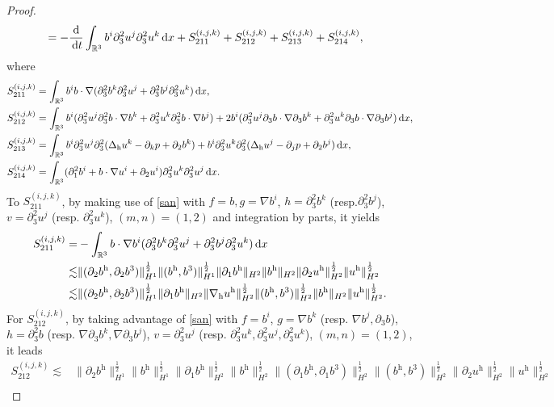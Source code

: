 \documentclass[11pt]{amsart}
\theoremstyle{definition}
\newcommand{\R}{\mathbb{R}}
\newcommand{\h}{\mathrm{h}}
\newcommand{\dx}{\,{\rm d}x}
\newcommand{\dt}{\,{\rm d}t}
\newcommand{\nablah}{\nabla_{\mathrm{h}}}
\numberwithin{equation}{section}
\begin{document}
\begin{proof}
\begin{align}
		& =-\frac{\mathrm{d}}{\dt}\int_{\R^3}b^i\partial_3^2u^j\partial_3^2u^k\dx+S^{(i,j,k)}_{211}+S^{(i,j,k)}_{212}+S^{(i,j,k)}_{213}+S^{(i,j,k)}_{214},
	\end{align}
	where
	\begin{align*}
		S^{(i,j,k)}_{211}&=\int_{\R^3} b^ib\cdot\nabla (\partial_3^2b^k\partial_3^2u^j+\partial_3^2b^j\partial_3^2u^k)\dx,\\
		S^{(i,j,k)}_{212}&=\int_{\R^3}b^i(\partial_3^2u^j\partial_3^2b\cdot\nabla b^k+\partial_3^2u^k\partial_3^2b\cdot\nabla b^j)+2b^i(\partial_3^2u^j\partial_3b\cdot\nabla \partial_3b^k+\partial_3^2u^k\partial_3b\cdot\nabla \partial_3b^j)\dx,\\
		S^{(i,j,k)}_{213}&=\int_{\R^3}b^i\partial_3^2u^j\partial_3^2(\Delta_\h u^k-\partial_kp+\partial_2b^k)+b^i\partial_3^2u^k\partial_3^2(\Delta_\h u^j-\partial_jp+\partial_2b^j)\dx,\\
		S^{(i,j,k)}_{214}&=\int_{\R^3}(\partial_1^2b^i+b\cdot\nabla u^i+\partial_2u^i)\partial_3^2u^k\partial_3^2u^j\dx.
	\end{align*}
	To $S^{(i,j,k)}_{211}$, by making use of \eqref{san} with $f=b,g=\nabla b^i$, $h=\partial_3^2b^k$ (resp.$\partial_3^2b^j$), $v=\partial_3^2u^j$ (resp. $\partial_3^2u^k$), $(m,n)=(1,2)$ and integration by parts, it yields
	\begin{align}\label{S211}
		S^{(i,j,k)}_{211}=&-\int_{\R^3} b\cdot\nabla b^i (\partial_3^2b^k\partial_3^2u^j+\partial_3^2b^j\partial_3^2u^k)\dx\nonumber\\
		\lesssim&\|(\partial_2b^\h,\partial_2b^3)\|_{H^1}^\frac12\|(b^\h,b^3)\|_{H^1}^\frac12\|\partial_1b^\h\|_{H^2}\|b^\h\|_{H^2}\|\partial_2u^\h\|_{H^2}^\frac12\|u^\h\|_{H^2}^\frac12\nonumber\\
		\lesssim&\|(\partial_2b^\h,\partial_2b^3)\|_{H^1}^\frac12\|\partial_1b^\h\|_{H^2}\|\nablah u^\h\|_{H^2}^\frac12\|(b^\h,b^3)\|_{H^2}^\frac12\|b^\h\|_{H^2}\|u^\h\|_{H^2}^\frac12.
	\end{align}
	For $S^{(i,j,k)}_{212}$, by taking advantage of \eqref{san} with $f=b^i$, $g=\nabla b^k$ (resp. $\nabla b^j,\partial_3b$), $h=\partial_3^2b$ (resp. $\nabla \partial_3b^k,\nabla \partial_3b^j$), $v=\partial_3^2u^j$ (resp. $\partial_3^2u^k,\partial_3^2u^j,\partial_3^2u^k$), $(m,n)=(1,2)$, it leads
	\begin{align}\label{S212}
		S^{(i,j,k)}_{212}	\lesssim&\|\partial_2b^\h\|_{H^1}^\frac12\|b^\h\|_{H^1}^\frac12\|\partial_1b^\h\|_{H^2}^\frac12\|b^\h\|_{H^2}^\frac12\|(\partial_1b^\h,\partial_1b^3)\|_{H^2}^\frac12\|(b^\h,b^3)\|_{H^2}^\frac12\|\partial_2u^\h\|_{H^2}^\frac12\|u^\h\|_{H^2}^\frac12\nonumber\\

\end{align}
\end{proof}
\end{document}
